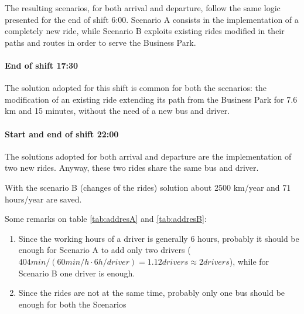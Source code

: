The resulting scenarios, for both arrival and departure, follow the same logic presented for the end of shift 6:00. Scenario A consists in the implementation of a completely new ride, while Scenario B exploits existing rides modified in their paths and routes in order to serve the Business Park.

\paragraph{End of shift 17:30}

The solution adopted for this shift is common for both the scenarios: the modification of an existing ride extending its path from the Business Park for 7.6 km and 15 minutes, without the need of a new bus and driver.
\paragraph{Start and end of shift 22:00}

The solutions adopted for both arrival and departure are the implementation of two new rides. Anyway, these two rides share the same bus and driver.




With the scenario B (changes of the rides) solution about 2500 km/year and 71 hours/year are saved.

Some remarks on table \ref{tab:addresA} and \ref{tab:addresB}:
\begin{enumerate}
    \item Since the working hours of a driver is generally 6 hours, probably it should be enough for Scenario A to add only two drivers ($404 min/(60 min/h \cdot 6 h/driver) = 1.12 drivers \approx 2 drivers$), while for Scenario B one driver is enough.
    \item Since the rides are not at the same time, probably only one bus should be enough for both the Scenarios
\end{enumerate}